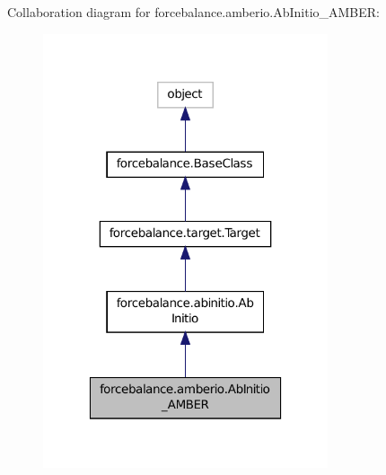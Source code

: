 Collaboration diagram for forcebalance.\-amberio.\-Ab\-Initio\-\_\-\-A\-M\-B\-E\-R\-:
\nopagebreak
\begin{figure}[H]
\begin{center}
\leavevmode
\includegraphics[width=238pt]{classforcebalance_1_1amberio_1_1AbInitio__AMBER__coll__graph}
\end{center}
\end{figure}
